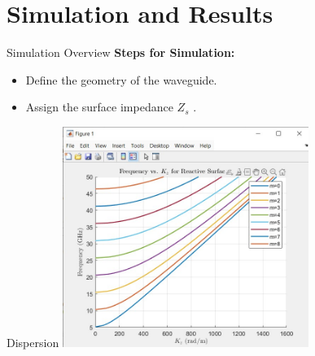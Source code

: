 \documentclass{beamer}
\begin{document}
\section{Simulation and Results}
\begin{frame}{Simulation Overview}
    \textbf{Steps for Simulation:}
    \begin{itemize}
        \item Define the geometry of the waveguide.
        \item Assign the surface impedance \( Z_s \) .
    \end{itemize}
\end{frame}
\begin{frame}{Dispersion}
        \centering
            \includegraphics[width=0.6\textwidth]{plot.jpg}
\end{frame}
\end{document}
